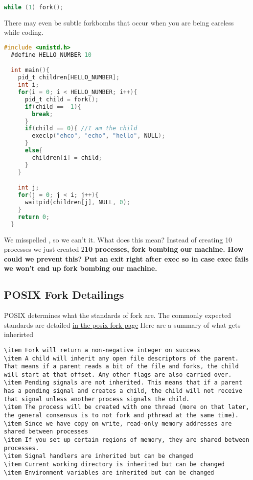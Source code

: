 \begin{lstlisting}[language=C]
  while (1) fork();
\end{lstlisting}

There may even be subtle forkbombs that occur when you are being careless while coding.

\begin{lstlisting}[language=C]
  #include <unistd.h>
  #define HELLO_NUMBER 10

  int main(){
    pid_t children[HELLO_NUMBER];
    int i;
    for(i = 0; i < HELLO_NUMBER; i++){
      pid_t child = fork();
      if(child == -1){
        break;
      }
      if(child == 0){ //I am the child
        execlp("ehco", "echo", "hello", NULL);
      }
      else{
        children[i] = child;
      }
    }

    int j;
    for(j = 0; j < i; j++){
      waitpid(children[j], NULL, 0);
    }
    return 0;
  }
\end{lstlisting}

We misspelled , so we can't  it. What does this mean? Instead of creating 10 processes we just created 2\textbf{10 processes, fork bombing our machine. How could we prevent this? Put an exit right after exec so in case exec fails we won't end up fork bombing our machine.}

\subsection{POSIX Fork Detailings}

POSIX determines what the standards of fork are. The commonly expected standards are detailed \href{https://pubs.opengroup.org/onlinepubs/009695399/functions/fork.html}{in the posix fork page} Here are a summary of what gets inherirted

\begin{lstlisting}
\item Fork will return a non-negative integer on success
\item A child will inherit any open file descriptors of the parent. That means if a parent reads a bit of the file and forks, the child will start at that offset. Any other flags are also carried over.
\item Pending signals are not inherited. This means that if a parent has a pending signal and creates a child, the child will not receive that signal unless another process signals the child.
\item The process will be created with one thread (more on that later, the general consensus is to not fork and pthread at the same time).
\item Since we have copy on write, read-only memory addresses are shared between processes
\item If you set up certain regions of memory, they are shared between processes.
\item Signal handlers are inherited but can be changed
\item Current working directory is inherited but can be changed
\item Environment variables are inherited but can be changed
\end{lstlisting}


